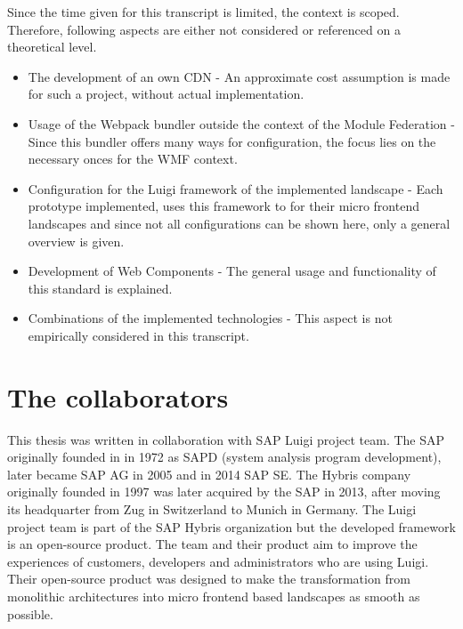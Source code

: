 Since the time given for this transcript is limited, the context is scoped. Therefore, following aspects are either not considered or referenced on a theoretical level.

\begin{itemize}
	\item The development of an own CDN - An approximate cost assumption is made for such a project, without actual implementation.
	\item Usage of the Webpack bundler outside the context of the Module Federation - Since this bundler offers many ways for configuration, the focus lies on the necessary onces for the WMF context.
	\item Configuration for the Luigi framework of the implemented landscape - Each prototype implemented, uses this framework to for their micro frontend landscapes and since not all configurations can be shown here, only a general overview is given.
	\item Development of Web Components - The general usage and functionality of this standard is explained.
	\item Combinations of the implemented technologies - This aspect is not empirically considered in this transcript.
\end{itemize}

\section{The collaborators}

This thesis was written in collaboration with SAP Luigi project team. The SAP originally founded in in 1972 as SAPD (system analysis program development), later became SAP AG in 2005 and in 2014 SAP SE. The Hybris company originally founded in 1997 was later acquired by the SAP in 2013, after moving its headquarter from Zug in Switzerland to Munich in Germany. The Luigi project team is part of the SAP Hybris organization but the developed framework is an open-source product. 
The team and their product aim to improve the experiences of customers, developers and administrators who are using Luigi. Their open-source product was designed to make the transformation from monolithic architectures into micro frontend based landscapes as smooth as possible. 

 
